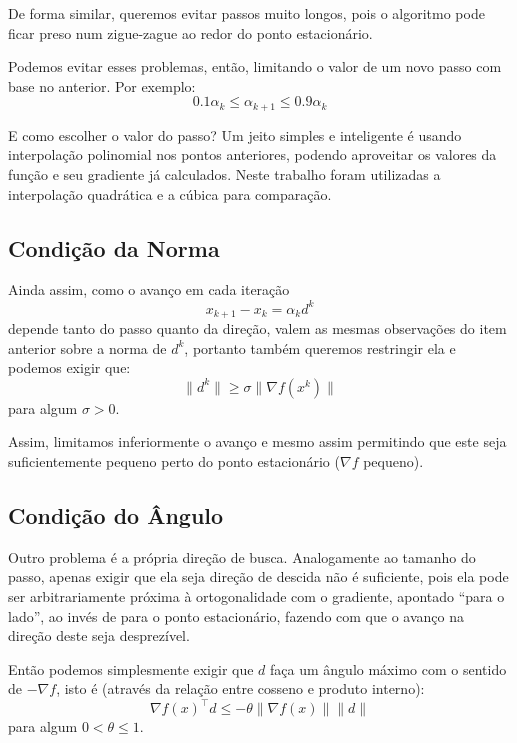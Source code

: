 \documentclass[a4paper,11pt]{article}
\begin{document}
            De forma similar, queremos evitar passos muito longos, pois o algoritmo pode ficar preso num zigue-zague ao redor do
            ponto estacionário.

            Podemos evitar esses problemas, então, limitando o valor de um novo passo com base no anterior. Por exemplo:
            $$ 0.1\alpha_k \leq \alpha_{k+1} \leq 0.9\alpha_k$$

            E como escolher o valor do passo? Um jeito simples e inteligente é usando interpolação polinomial nos pontos
            anteriores, podendo aproveitar os valores da função e seu gradiente já calculados. Neste trabalho foram utilizadas
            a interpolação quadrática e a cúbica para comparação.

        \subsection*{Condição da Norma}
            Ainda assim, como o avanço em cada iteração
                $$x_{k+1} - x_k = \alpha_k d^k$$
            depende tanto do passo quanto da direção, valem as mesmas observações do item anterior sobre a norma de $d^k$, portanto
            também queremos restringir ela e podemos exigir que:
                $$ \|d^k\| \geq \sigma \|\nabla f(x^k) \|$$
            para algum $\sigma > 0$.

            Assim, limitamos inferiormente o avanço e mesmo assim permitindo que este seja suficientemente pequeno perto do ponto estacionário
            ($ \nabla f $ pequeno).

        \subsection*{Condição do Ângulo}
            Outro problema é a própria direção de busca. Analogamente ao tamanho do passo, apenas exigir que ela seja direção de descida não
            é suficiente, pois ela pode ser arbitrariamente próxima à ortogonalidade com o gradiente, apontado ``para o lado'', ao invés de
            para o ponto estacionário, fazendo com que o avanço na direção deste seja desprezível.

            Então podemos simplesmente exigir que $d$ faça um ângulo máximo com o sentido de $-\nabla f$, isto é (através da relação entre cosseno
            e produto interno):
                $$ \nabla f(x)^\top d \leq -\theta \|\nabla f(x)\| \|d\| $$
            para algum $0 < \theta \leq 1$.
\end{document}
